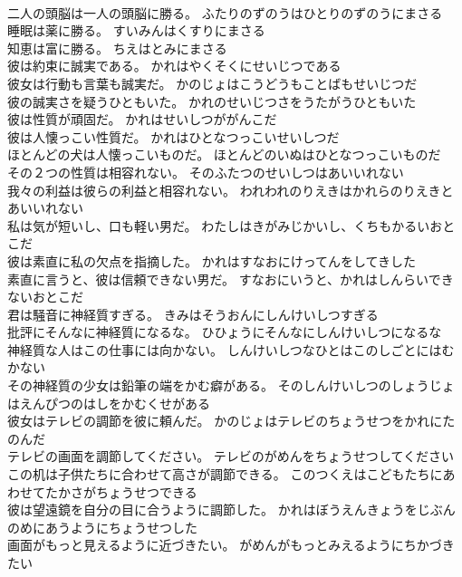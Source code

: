 \documentclass[8pt]{extreport}
\begin{document}
\begin{CJK}{UTF8}{min}
\\	二人の頭脳は一人の頭脳に勝る。	ふたりのずのうはひとりのずのうにまさる 
\\	睡眠は薬に勝る。	すいみんはくすりにまさる 
\\	知恵は富に勝る。	ちえはとみにまさる 
\\	彼は約束に誠実である。	かれはやくそくにせいじつである 
\\	彼女は行動も言葉も誠実だ。	かのじょはこうどうもことばもせいじつだ 
\\	彼の誠実さを疑うひともいた。	かれのせいじつさをうたがうひともいた 
\\	彼は性質が頑固だ。	かれはせいしつががんこだ 
\\	彼は人懐っこい性質だ。	かれはひとなつっこいせいしつだ 
\\	ほとんどの犬は人懐っこいものだ。	ほとんどのいぬはひとなつっこいものだ 
\\	その２つの性質は相容れない。	そのふたつのせいしつはあいいれない 
\\	我々の利益は彼らの利益と相容れない。	われわれのりえきはかれらのりえきとあいいれない 
\\	私は気が短いし、口も軽い男だ。	わたしはきがみじかいし、くちもかるいおとこだ 
\\	彼は素直に私の欠点を指摘した。	かれはすなおにけってんをしてきした 
\\	素直に言うと、彼は信頼できない男だ。	すなおにいうと、かれはしんらいできないおとこだ 
\\	君は騒音に神経質すぎる。	きみはそうおんにしんけいしつすぎる 
\\	批評にそんなに神経質になるな。	ひひょうにそんなにしんけいしつになるな 
\\	神経質な人はこの仕事には向かない。	しんけいしつなひとはこのしごとにはむかない 
\\	その神経質の少女は鉛筆の端をかむ癖がある。	そのしんけいしつのしょうじょはえんぴつのはしをかむくせがある 
\\	彼女はテレビの調節を彼に頼んだ。	かのじょはテレビのちょうせつをかれにたのんだ 
\\	テレビの画面を調節してください。	テレビのがめんをちょうせつしてください 
\\	この机は子供たちに合わせて高さが調節できる。	このつくえはこどもたちにあわせてたかさがちょうせつできる 
\\	彼は望遠鏡を自分の目に合うように調節した。	かれはぼうえんきょうをじぶんのめにあうようにちょうせつした 
\\	画面がもっと見えるように近づきたい。	がめんがもっとみえるようにちかづきたい 

\end{CJK}
\end{document}
